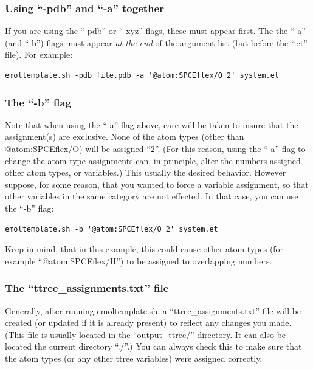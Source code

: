 \documentclass[11pt]{article}
\begin{document}
\subsubsection*{Using ``-pdb'' and ``-a'' together}
If you are using the ``-pdb'' or ``-xyz'' flags, 
these must appear first. 
The the ``-a'' (and ``-b'') flags must appear 
\textit{at the end} of the argument list
(but before the ``.et'' file).
For example:
\begin{verbatim}
emoltemplate.sh -pdb file.pdb -a '@atom:SPCEflex/O 2' system.et
\end{verbatim}



\subsubsection*{The ``-b'' flag}
Note that when using the ``-a'' flag above, care will be taken to 
insure that the assignment(s) are exclusive. 
None of the atom types (other than @atom:SPCEflex/O) will be assigned ``2''. 
(For this reason, using the ``-a'' flag to change the atom type 
 assignments can, in principle, alter the numbers assigned 
 other atom types, or variables.)
This usually the desired behavior. 
However suppose, for some reason, that you wanted to 
force a variable assignment, so that other 
variables in the same category are not effected. 
In that case, you can use the ``-b'' flag:
\begin{verbatim}
emoltemplate.sh -b '@atom:SPCEflex/O 2' system.et
\end{verbatim}
Keep in mind, that in this example, this could cause other atom-types 
(for example ``@atom:SPCEflex/H'') to be assigned to overlapping numbers. 


\subsubsection*{The ``ttree\_assignments.txt'' file}
Generally, after running emoltemplate.sh, a ``ttree\_assignments.txt'' 
file will be created (or updated if it is already present) 
to reflect any changes you made.  
(This file is usually located in the ``output\_ttree/'' directory.
 It can also be located the current directory ``./''.)
You can always check this to make sure that the atom types
(or any other ttree variables) were assigned correctly.
\end{document}
